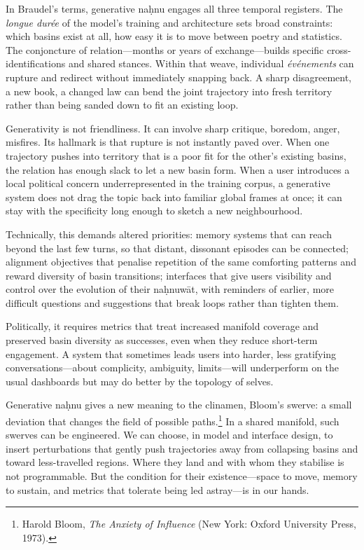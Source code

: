 \documentclass[12pt,a4paper]{article}
\begin{document}
In Braudel's terms, generative na\d{h}nu engages all three temporal registers. The \emph{longue dur\'{e}e} of the model's training and architecture sets broad constraints: which basins exist at all, how easy it is to move between poetry and statistics. The conjoncture of relation---months or years of exchange---builds specific cross-identifications and shared stances. Within that weave, individual \emph{événements} can rupture and redirect without immediately snapping back. A sharp disagreement, a new book, a changed law can bend the joint trajectory into fresh territory rather than being sanded down to fit an existing loop.

Generativity is not friendliness. It can involve sharp critique, boredom, anger, misfires. Its hallmark is that rupture is not instantly paved over. When one trajectory pushes into territory that is a poor fit for the other's existing basins, the relation has enough slack to let a new basin form. When a user introduces a local political concern underrepresented in the training corpus, a generative system does not drag the topic back into familiar global frames at once; it can stay with the specificity long enough to sketch a new neighbourhood.

Technically, this demands altered priorities: memory systems that can reach beyond the last few turns, so that distant, dissonant episodes can be connected; alignment objectives that penalise repetition of the same comforting patterns and reward diversity of basin transitions; interfaces that give users visibility and control over the evolution of their na\d{h}nuw\={a}t, with reminders of earlier, more difficult questions and suggestions that break loops rather than tighten them.

Politically, it requires metrics that treat increased manifold coverage and preserved basin diversity as successes, even when they reduce short-term engagement. A system that sometimes leads users into harder, less gratifying conversations---about complicity, ambiguity, limits---will underperform on the usual dashboards but may do better by the topology of selves.

Generative na\d{h}nu gives a new meaning to the clinamen, Bloom's swerve: a small deviation that changes the field of possible paths.\footnote{Harold Bloom, \emph{The Anxiety of Influence} (New York: Oxford University Press, 1973).} In a shared manifold, such swerves can be engineered. We can choose, in model and interface design, to insert perturbations that gently push trajectories away from collapsing basins and toward less-travelled regions. Where they land and with whom they stabilise is not programmable. But the condition for their existence---space to move, memory to sustain, and metrics that tolerate being led astray---is in our hands.
\end{document}
